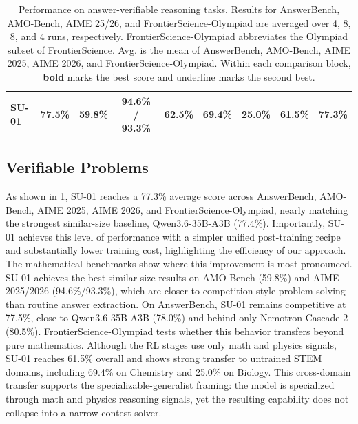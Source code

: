 \documentclass{llmxive}
\begin{document}
\begin{table}[t]
{\begin{tabular}{lcccccccc}
\rowcolor{ScienceReasoningBg!35}
\textbf{SU-01} & 77.5\% & \textbf{59.8\%} & \textbf{94.6\%} / \textbf{93.3\%} & 62.5\% & \underline{69.4\%} & 25.0\% & \underline{61.5\%} & \underline{77.3\%} \\
\bottomrule
\end{tabular}%
}
\caption{Performance on answer-verifiable reasoning tasks. Results for AnswerBench, AMO-Bench, AIME 25/26, and FrontierScience-Olympiad are averaged over 4, 8, 8, and 4 runs, respectively. FrontierScience-Olympiad abbreviates the Olympiad subset of FrontierScience. Avg. is the mean of AnswerBench, AMO-Bench, AIME 2025, AIME 2026, and FrontierScience-Olympiad. Within each comparison block, \textbf{bold} marks the best score and underline marks the second best.}
\label{tab:verifiable-single-pass}
\end{table}

\subsection{Verifiable Problems}

  As shown in
  \cref{tab:verifiable-single-pass}, SU-01 reaches a 77.3\% average score across
  AnswerBench, AMO-Bench, AIME 2025, AIME 2026, and FrontierScience-Olympiad,
  nearly matching the strongest similar-size baseline, Qwen3.6-35B-A3B (77.4\%).
  Importantly, SU-01 achieves this level of performance with a simpler unified
  post-training recipe and substantially lower training cost, highlighting the
  efficiency of our approach.
The mathematical benchmarks show where this improvement is most pronounced.
SU-01 achieves the best similar-size results on AMO-Bench (59.8\%) and AIME
2025/2026 (94.6\%/93.3\%), which are closer to competition-style problem solving
than routine answer extraction. On AnswerBench, SU-01 remains competitive at
77.5\%, close to Qwen3.6-35B-A3B (78.0\%) and behind only Nemotron-Cascade-2
(80.5\%). 
  FrontierScience-Olympiad tests whether this behavior transfers beyond pure
  mathematics. Although the RL stages use only math and physics signals, SU-01
  reaches 61.5\% overall and shows strong transfer to untrained STEM domains,
  including 69.4\% on Chemistry and 25.0\% on Biology. This cross-domain transfer
  supports the specializable-generalist framing: the model is specialized through
  math and physics reasoning signals, yet the resulting capability does not
  collapse into a narrow contest solver.
\end{document}
